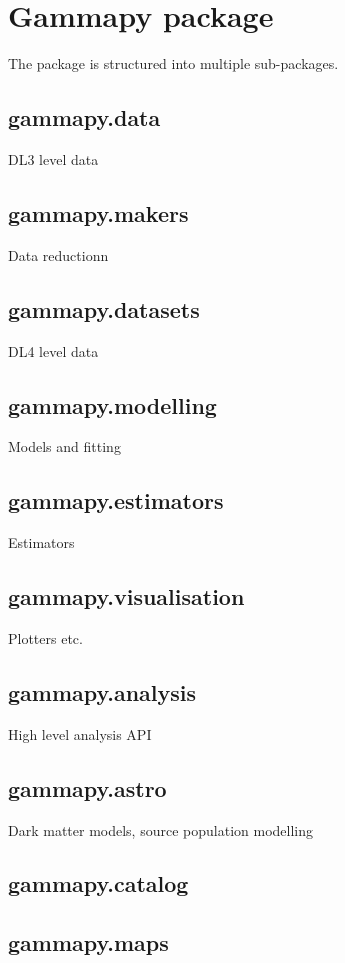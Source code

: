 \section{Gammapy package}
\label{sec:package}

The \gammapy package is structured into multiple sub-packages.

\subsection{gammapy.data}
DL3 level data

\subsection{gammapy.makers}
Data reductionn

\subsection{gammapy.datasets}
DL4 level data

\subsection{gammapy.modelling}
Models and fitting

\subsection{gammapy.estimators}
Estimators

\subsection{gammapy.visualisation}
Plotters etc.
\subsection{gammapy.analysis}
High level analysis API

\subsection{gammapy.astro}
Dark matter models, source population modelling


\subsection{gammapy.catalog}
\subsection{gammapy.maps}
